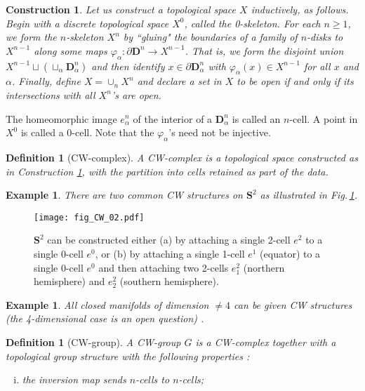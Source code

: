 \documentclass[sort&compress]{elsarticle}
\theoremstyle{theoremstyle}
\theoremstyle{framedtheoremstyle}
\theoremstyle{definitionstyle}
\newtheorem{dfn}[nul]{Definition}%
\theoremstyle{definitionstyle}
\theoremstyle{definitionstyle}
\theoremstyle{definitionstyle}
\newtheorem{exm}[nul]{Example}
\newtheorem{cnstr}[nul]{Construction}
\theoremstyle{nameddefinitionstyle}
\theoremstyle{framednameddefinitionstyle}
\theoremstyle{proofstyle}
\theoremstyle{definitionstyle}
\newcommand{\fromto}{\rightarrow}
\newcommand{\DD}{\mathbf{D}}
\renewcommand{\SS}{\mathbf{S}}
\newcommand{\paren}[1]{\left( #1 \right)}
\begin{document}
\begin{appendices}
\begin{cnstr}
Let us construct a topological space $X$ inductively, as follows. Begin with a discrete topological space $X^0$, called the 0-skeleton. For each $n \geq 1$, we form the $n$-skeleton $X^n$ by ``gluing" the boundaries of a family of $n$-disks to $X^{n-1}$ along some maps $\varphi_\alpha: \partial \DD^n \fromto X^{n-1}$. That is, we form the disjoint union $X^{n-1} \sqcup \paren{\sqcup_\alpha \DD^n_\alpha}$ and then identify $x\in \partial \DD^n_\alpha$ with $\varphi_\alpha(x) \in X^{n-1}$ for all $x$ and $\alpha$. Finally, define $X = \cup_n X^n$ and declare a set in $X$ to be open if and only if its intersections with all $X^n$'s are open.\label{cnstr:CW-complex}
\end{cnstr}

The homeomorphic image $e^n_\alpha$ of the interior of a $\DD^n_\alpha$ is called an $n$-cell. A point in $X^0$ is called a 0-cell. Note that the $\varphi_\alpha$'s need not be injective.

\begin{dfn}[CW-complex]
A CW-complex is a topological space constructed as in Construction \ref{cnstr:CW-complex}, with the partition into cells retained as part of the data.
\end{dfn}

\begin{exm}
There are two common CW structures on $\SS^2$ as illustrated in Fig.\,\ref{fig:sphere_CW_structures}.
\end{exm}%
%
\begin{figure}[t]
\centering
\texttt{[image: fig\_CW\_02.pdf]}
\caption{$\SS^2$ can be constructed either (a) by attaching a single 2-cell $e^2$ to a single 0-cell $e^0$, or (b) by attaching a single 1-cell $e^1$ (equator) to a single 0-cell $e^0$ and then attaching two 2-cells $e^2_1$ (northern hemisphere) and $e^2_2$ (southern hemisphere).}
\label{fig:sphere_CW_structures}
\end{figure}%

\begin{exm}
All closed manifolds of dimension $\neq 4$ can be given CW structures (the 4-dimensional case is an open question) \cite{KirbySiebenmann, FreedmanQuinn}.
\end{exm}

\begin{dfn}[CW-group]
A CW-group $G$ is a CW-complex together with a topological group structure with the following properties \cite{AdemMilgram, Milnor1956_I, Milnor1956_II}:
\begin{enumerate}[(i)]
\item the inversion map sends $n$-cells to $n$-cells;


\end{enumerate}
\end{dfn}
\end{appendices}
\end{document}

